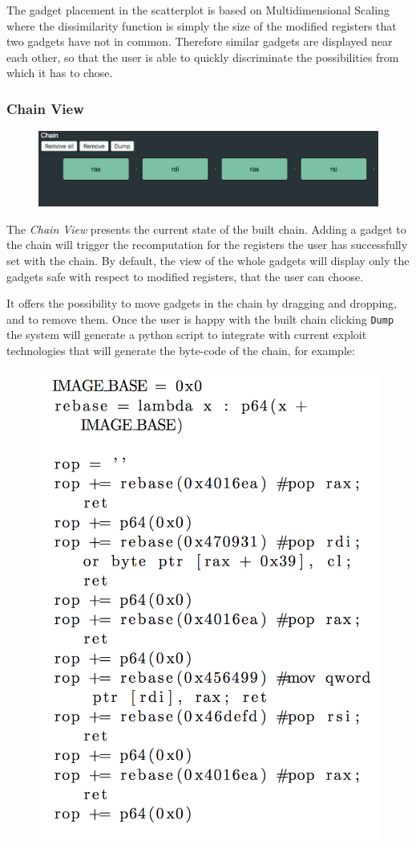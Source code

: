 \documentclass[twocolumn, 11pt]{article}
\begin{document}
The gadget placement in the scatterplot is based on Multidimensional Scaling where the dissimilarity function is simply the size of the modified registers that two gadgets have not in common. Therefore similar gadgets are displayed near each other, so that the user is able to quickly discriminate the possibilities from which it has to chose.

\subsubsection{Chain View}
\begin{figure}[htb]
  \centering
  \includegraphics[width=0.7\linewidth]{chain-view}
\end{figure}

The \textit{Chain View} presents the current state of the built chain. Adding a gadget to the chain will trigger the recomputation for the registers the user has successfully set with the chain. By default, the view of the whole gadgets will display only the gadgets safe with respect to modified registers, that the user can choose.

It offers the possibility to move gadgets in the chain by dragging and dropping, and to remove them. Once the user is happy with the built chain clicking {\tt Dump} the system will generate a python script to integrate with current exploit technologies that will generate the byte-code of the chain, for example:

\begin{figure}[htb]
  \centering
  \includegraphics[width=0.6\linewidth]{dump}
\end{figure}
\end{document}
